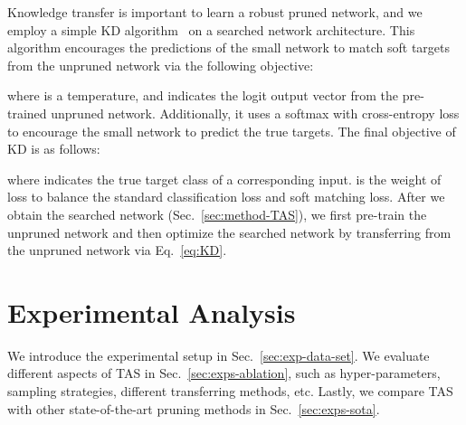 \documentclass{article}
\def\Secref#1{Sec.~\ref{#1}}
\def\Eqref#1{Eq.~\eqref{#1}}
\def\NAME{{TAS}}
\begin{document}
Knowledge transfer is important to learn a robust pruned network, and we employ a simple KD algorithm~\cite{hinton2014distilling} on a searched network architecture.
This algorithm encourages the predictions  of the small network to match soft targets from the unpruned network via the following objective:

where  is a temperature, and  indicates the logit output vector from the pre-trained unpruned network.
Additionally, it uses a softmax with cross-entropy loss to encourage the small network to predict the true targets. The final objective of KD is as follows:

where  indicates the true target class of a corresponding input.
 is the weight of loss to balance the standard classification loss and soft matching loss.
After we obtain the searched network (\Secref{sec:method-TAS}), we first pre-train the unpruned network and then optimize the searched network by transferring from the unpruned network via \Eqref{eq:KD}.







\section{Experimental Analysis}\label{sec:exps}

We introduce the experimental setup in \Secref{sec:exp-data-set}.
We evaluate different aspects of {\NAME} in \Secref{sec:exps-ablation}, such as hyper-parameters, sampling strategies, different transferring methods, etc.
Lastly, we compare {\NAME} with other state-of-the-art pruning methods in \Secref{sec:exps-sota}.
\end{document}
